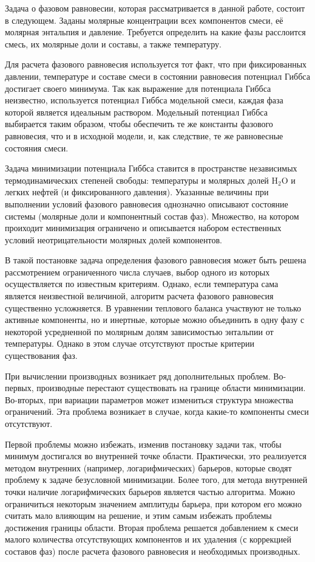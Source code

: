 \documentclass[12pt]{article}
\begin{document}
Задача о фазовом равновесии, которая рассматривается в данной работе, состоит в следующем. Заданы молярные концентрации всех компонентов смеси, её молярная энтальпия и давление. Требуется определить на какие фазы расслоится смесь, их молярные доли и составы, а также температуру.

Для расчета фазового равновесия используется тот факт, что при фиксированных давлении, температуре и составе смеси в состоянии равновесия потенциал Гиббса достигает своего минимума. Так как выражение для потенциала Гиббса неизвестно, используется потенциал Гиббса модельной смеси, каждая фаза которой является идеальным раствором. Модельный потенциал Гиббса выбирается таким образом, чтобы обеспечить те же константы фазового равновесия, что и в исходной модели, и, как следствие, те же равновесные состояния смеси.

Задача минимизации потенциала Гиббса ставится в пространстве независимых термодинамических степеней свободы: температуры и молярных долей $\mathrm{H_2O}$ и легких нефтей (и фиксированного давления). Указанные величины при выполнении условий фазового равновесия однозначно описывают состояние системы (молярные доли и компонентный состав фаз). Множество, на котором проиходит минимизация ограничено и описывается набором естественных условий неотрицательности молярных долей компонентов.

В такой постановке задача определения фазового равновесия может быть решена рассмотрением ограниченного числа случаев, выбор одного из которых осуществляется по известным критериям. Однако, если температура сама является неизвестной величиной, алгоритм расчета фазового равновесия существенно усложняется. В уравнении теплового баланса участвуют не только активные компоненты, но и инертные, которые можно объединить в одну фазу с некоторой усредненной по молярным долям зависимостью энтальпии от температуры. Однако в этом случае отсутствуют простые критерии существования фаз.

При вычислении производных возникает ряд дополнительных проблем. Во-первых, производные перестают существовать на границе области минимизации. Во-вторых, при вариации параметров может измениться структура множества ограничений. Эта проблема возникает в случае, когда какие-то компоненты смеси отсутствуют.

Первой проблемы можно избежать, изменив постановку задачи так, чтобы минимум достигался во внутренней точке области. Практически, это реализуется методом внутренних (например, логарифмических) барьеров, которые сводят проблему к задаче безусловной минимизации. Более того, для метода внутренней точки наличие логарифмических барьеров является частью алгоритма. Можно ограничиться некоторым значением амплитуды барьера, при котором его можно считать мало влияющим на решение, и этим самым избежать проблемы достижения границы области. Вторая проблема решается добавлением к смеси малого количества отсутствующих компонентов и их удаления (с коррекцией составов фаз) после расчета фазового равновесия и необходимых производных.
\end{document}
